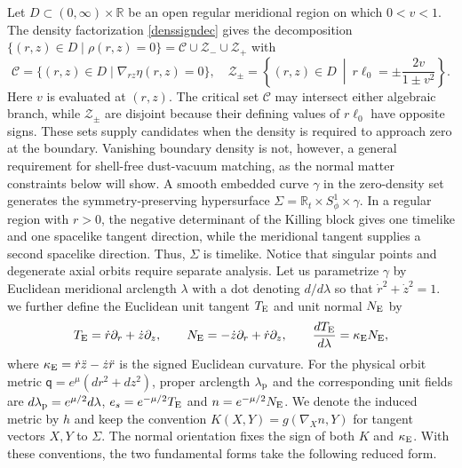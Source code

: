 \documentclass[amsmath,amsfonts,amssymb,aps,pra,superscriptaddress,10pt]{revtex4-2}
\numberwithin{equation}{section}
\theoremstyle{plain}
\theoremstyle{definition}
\theoremstyle{remark}
\theoremstyle{definition}
\newcommand{\ellzero}{\ell_0}
\newcommand{\gradRZ}{\nabla_{rz}}
\begin{document}
Let $D\subset(0,\infty)\times\mathbb{R}$ be an open regular meridional region on which $0<v<1$. The density factorization \eqref{denssigndec} gives the decomposition $\{(r,z)\in D\mid\rho(r,z)=0\}=\mathcal{C}\cup\mathcal{Z}_-\cup\mathcal{Z}_+$ with
\begin{equation}
\mathcal{C}=\bigl\{(r,z)\in D\mid\gradRZ\eta(r,z)=0\bigr\},\quad
\mathcal{Z}_\pm=\left\{(r,z)\in D~\middle|~r\ellzero=\pm\frac{2v}{1\pm v^2}\right\}.
\end{equation}
Here $v$ is evaluated at $(r,z)$. The critical set $\mathcal{C}$ may intersect either algebraic branch, while $\mathcal Z_\pm$ are disjoint because their defining values of $r\ellzero$ have opposite signs. These sets supply candidates when the density is required to approach zero at the boundary. Vanishing boundary density is not, however, a general requirement for shell-free dust-vacuum matching, as the normal matter constraints below will show. A smooth embedded curve $\gamma$ in the zero-density set generates the symmetry-preserving hypersurface $\Sigma=\mathbb{R}_t\times S^1_\phi\times\gamma$. In a regular region with $r>0$, the negative determinant of the Killing block gives one timelike and one spacelike tangent direction, while the meridional tangent supplies a second spacelike direction. Thus, $\Sigma$ is timelike. Notice that singular points and degenerate axial orbits require separate analysis. Let us parametrize $\gamma$ by Euclidean meridional arclength $\lambda$ with a dot denoting $d/d\lambda$ so that $\dot{r}^2+\dot{z}^2=1$. we further define the Euclidean unit tangent $T_{\rm{E}}$ and unit normal $N_{\rm{E}}$ by
\begin{equation}\label{eucltannorm}
T_{\rm{E}}=\dot{r}\partial_r+\dot{z}\partial_z,\qquad
N_{\rm{E}}=-\dot{z}\partial_r+\dot{r}\partial_z,\qquad
\frac{dT_{\rm{E}}}{d\lambda}=\kappa_{\rm{E}}N_{\rm{E}},
\end{equation}
where $\kappa_{\rm{E}}=\dot{r}\ddot{z}-\dot{z}\ddot{r}$ is the signed Euclidean curvature. For the physical orbit metric $\mathsf{q}=e^\mu(dr^2+dz^2)$, proper arclength $\lambda_{\rm{p}}$ and the corresponding unit fields are $d\lambda_{\rm{p}}=e^{\mu/2}d\lambda$, $
e_s=e^{-\mu/2}T_{\rm{E}}$ and $n=e^{-\mu/2}N_{\rm{E}}$. We denote the induced metric by $h$ and keep the convention $K(X,Y)=g(\nabla_Xn,Y)$ for tangent vectors $X,Y$ to $\Sigma$. The normal orientation fixes the sign of both $K$ and $\kappa_{\rm{E}}$. With these conventions, the two fundamental forms take the following reduced form.
\end{document}
